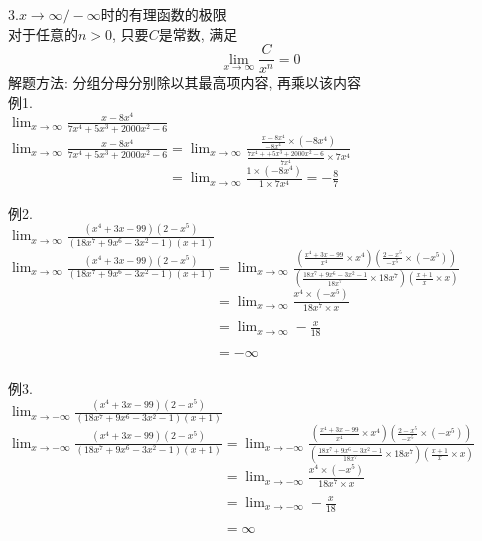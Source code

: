 3.$x\to\infty/-\infty$时的有理函数的极限\\
对于任意的$n>0$, 只要$C$是常数, 满足
\[\lim_{x\to\infty}\frac{C}{x^n}=0\]
解题方法: 分组分母分别除以其最高项内容, 再乘以该内容\\
例1.\\
\phantom{例}$\displaystyle\lim_{x\to\infty}\frac{x-8x^4}{7x^4+5x^3+2000x^2-6}$\\
$\displaystyle\lim_{x\to\infty}\frac{x-8x^4}{7x^4+5x^3+2000x^2-6}=\lim_{x\to\infty}\frac{\frac{x-8x^4}{-8x^4}\times(-8x^4)}{\frac{7x^4++5x^3+2000x^2-6}{7x^4}\times7x^4}$\\
$\displaystyle\phantom{\lim_{x\to\infty}\frac{x-8x^4}{7x^4+5x^3+2000x^2-6}}=\lim_{x\to\infty}\frac{1\times(-8x^4)}{1\times7x^4}=-\frac{8}{7}$\\\vspace{2ex}

例2.\\
\phantom{例}$\displaystyle\lim_{x\to\infty}\frac{(x^4+3x-99)(2-x^5)}{(18x^7+9x^6-3x^2-1)(x+1)}$\\
$\displaystyle\lim_{x\to\infty}\frac{(x^4+3x-99)(2-x^5)}{(18x^7+9x^6-3x^2-1)(x+1)}=\lim_{x\to\infty}\frac{(\frac{x^4+3x-99}{x^4}\times x^4)(\frac{2-x^5}{-x^5}\times(-x^5))}{(\frac{18x^7+9x^6-3x^2-1}{18x^7}\times18x^7)(\frac{x+1}{x}\times x)}$\\
$\displaystyle\phantom{\lim_{x\to\infty}\frac{(x^4+3x-99)(2-x^5)}{(18x^7+9x^6-3x^2-1)(x+1)}}=\lim_{x\to\infty}\frac{x^4\times(-x^5)}{18x^7\times x}$\\
$\displaystyle\phantom{\lim_{x\to\infty}\frac{(x^4+3x-99)(2-x^5)}{(18x^7+9x^6-3x^2-1)(x+1)}}=\lim_{x\to\infty}-\frac{x}{18}$\\
$\displaystyle\phantom{\lim_{x\to\infty}\frac{(x^4+3x-99)(2-x^5)}{(18x^7+9x^6-3x^2-1)(x+1)}}=-\infty$\\\vspace{2ex}

例3.\\
\phantom{例}$\displaystyle\lim_{x\to-\infty}\frac{(x^4+3x-99)(2-x^5)}{(18x^7+9x^6-3x^2-1)(x+1)}$\\
$\displaystyle\lim_{x\to-\infty}\frac{(x^4+3x-99)(2-x^5)}{(18x^7+9x^6-3x^2-1)(x+1)}=\lim_{x\to-\infty}\frac{(\frac{x^4+3x-99}{x^4}\times x^4)(\frac{2-x^5}{-x^5}\times(-x^5))}{(\frac{18x^7+9x^6-3x^2-1}{18x^7}\times18x^7)(\frac{x+1}{x}\times x)}$\\
$\displaystyle\phantom{\lim_{x\to-\infty}\frac{(x^4+3x-99)(2-x^5)}{(18x^7+9x^6-3x^2-1)(x+1)}}=\lim_{x\to-\infty}\frac{x^4\times(-x^5)}{18x^7\times x}$\\
$\displaystyle\phantom{\lim_{x\to-\infty}\frac{(x^4+3x-99)(2-x^5)}{(18x^7+9x^6-3x^2-1)(x+1)}}=\lim_{x\to-\infty}-\frac{x}{18}$\\
$\displaystyle\phantom{\lim_{x\to-\infty}\frac{(x^4+3x-99)(2-x^5)}{(18x^7+9x^6-3x^2-1)(x+1)}}=\infty$\\\vspace{2ex}


